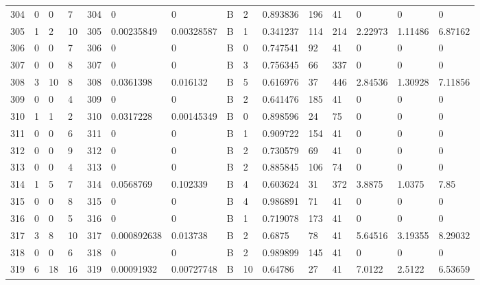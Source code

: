 \begin{latin}
\begin{longtable}{lllllllllllllll}
	304 & 0  & 0   & 7  & 304 & 0              & 0              & B & 2  & 0.893836 & 196  & 41   & 0       & 0       & 0       \\
	305 & 1  & 2   & 10 & 305 & 0.00235849     & 0.00328587     & B & 1  & 0.341237 & 114  & 214  & 2.22973 & 1.11486 & 6.87162 \\
	306 & 0  & 0   & 7  & 306 & 0              & 0              & B & 0  & 0.747541 & 92   & 41   & 0       & 0       & 0       \\
	307 & 0  & 0   & 8  & 307 & 0              & 0              & B & 3  & 0.756345 & 66   & 337  & 0       & 0       & 0       \\
	308 & 3  & 10  & 8  & 308 & 0.0361398      & 0.016132       & B & 5  & 0.616976 & 37   & 446  & 2.84536 & 1.30928 & 7.11856 \\
	309 & 0  & 0   & 4  & 309 & 0              & 0              & B & 2  & 0.641476 & 185  & 41   & 0       & 0       & 0       \\
	310 & 1  & 1   & 2  & 310 & 0.0317228      & 0.00145349     & B & 0  & 0.898596 & 24   & 75   & 0       & 0       & 0       \\
	311 & 0  & 0   & 6  & 311 & 0              & 0              & B & 1  & 0.909722 & 154  & 41   & 0       & 0       & 0       \\
	312 & 0  & 0   & 9  & 312 & 0              & 0              & B & 2  & 0.730579 & 69   & 41   & 0       & 0       & 0       \\
	313 & 0  & 0   & 4  & 313 & 0              & 0              & B & 2  & 0.885845 & 106  & 74   & 0       & 0       & 0       \\
	314 & 1  & 5   & 7  & 314 & 0.0568769      & 0.102339       & B & 4  & 0.603624 & 31   & 372  & 3.8875  & 1.0375  & 7.85    \\
	315 & 0  & 0   & 8  & 315 & 0              & 0              & B & 4  & 0.986891 & 71   & 41   & 0       & 0       & 0       \\
	316 & 0  & 0   & 5  & 316 & 0              & 0              & B & 1  & 0.719078 & 173  & 41   & 0       & 0       & 0       \\
	317 & 3  & 8   & 10 & 317 & 0.000892638    & 0.013738       & B & 2  & 0.6875   & 78   & 41   & 5.64516 & 3.19355 & 8.29032 \\
	318 & 0  & 0   & 6  & 318 & 0              & 0              & B & 2  & 0.989899 & 145  & 41   & 0       & 0       & 0       \\
	319 & 6  & 18  & 16 & 319 & 0.00091932     & 0.00727748     & B & 10 & 0.64786  & 27   & 41   & 7.0122  & 2.5122  & 6.53659 \\

\end{longtable}
\end{latin}
